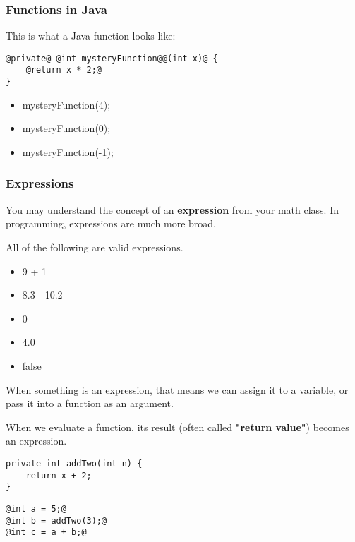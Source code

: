 \documentclass{beamer}
\begin{document}
\begin{frame}[fragile]
\frametitle{Functions in Java}
This is what a Java function looks like:
\begin{lstlisting}[style=base]
@private@ @int mysteryFunction@@(int x)@ {
    @return x * 2;@
}
\end{lstlisting}
\pause
\begin{itemize}
\item mysteryFunction(4);
\pause
\item mysteryFunction(0);
\pause
\item mysteryFunction(-1);
\end{itemize}
\end{frame}

\begin{frame}
\frametitle{Expressions}
You may understand the concept of an \textbf{expression} from your math class. In programming, expressions are much more broad.
\pause

All of the following are valid expressions.
\begin{itemize}
\item<3->9 + 1
\item<4->8.3 - 10.2
\item<5->0
\item<6->4.0
\item<7->false
\end{itemize}
\pause
When something is an expression, that means we can assign it to a variable, or pass it into a function as an argument.
\end{frame}

\begin{frame}[fragile]
When we evaluate a function, its result (often called \textbf{"return value"}) becomes an expression.
\begin{lstlisting}
private int addTwo(int n) {
    return x + 2;
}
\end{lstlisting}
\begin{lstlisting}[style=base]
@int a = 5;@
@int b = addTwo(3);@
@int c = a + b;@
\end{lstlisting}
\end{frame}
\end{document}
